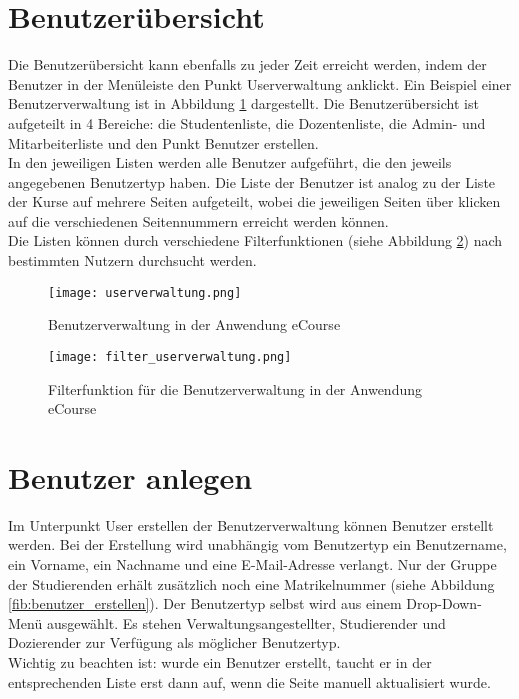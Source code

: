 \section{Benutzerübersicht}
Die Benutzerübersicht kann ebenfalls zu jeder Zeit erreicht werden, indem der Benutzer in der Menüleiste den Punkt \glqq Userverwaltung\grqq{} anklickt. Ein Beispiel einer Benutzerverwaltung ist in Abbildung \ref{fib:userverwaltung} dargestellt.
Die Benutzerübersicht ist aufgeteilt in 4 Bereiche: die Studentenliste, die Dozentenliste, die Admin- und Mitarbeiterliste und den Punkt \glqq Benutzer erstellen\grqq. \\
In den jeweiligen Listen werden alle Benutzer aufgeführt, die den jeweils angegebenen Benutzertyp haben. Die Liste der Benutzer ist analog zu der Liste der Kurse auf mehrere Seiten aufgeteilt, wobei die jeweiligen Seiten über klicken auf die verschiedenen Seitennummern erreicht werden können.\\
Die Listen können durch verschiedene Filterfunktionen (siehe Abbildung \ref{fib:filter}) nach bestimmten Nutzern durchsucht werden. 
\begin{figure}[h]
\centering
\texttt{[image: userverwaltung.png]}
\caption{Benutzerverwaltung in der Anwendung eCourse}
\label{fib:userverwaltung}
\end{figure}

\begin{figure}[h]
\centering
\texttt{[image: filter\_userverwaltung.png]}
\caption{Filterfunktion für die Benutzerverwaltung in der Anwendung eCourse}
\label{fib:filter}
\end{figure}


\section{Benutzer anlegen}
Im Unterpunkt \glqq User erstellen\grqq\: der Benutzerverwaltung können Benutzer erstellt werden. Bei der Erstellung wird unabhängig vom Benutzertyp ein Benutzername, ein Vorname, ein Nachname und eine E-Mail-Adresse verlangt. Nur der Gruppe der Studierenden erhält zusätzlich noch eine Matrikelnummer (siehe Abbildung \ref{fib:benutzer_erstellen}). Der Benutzertyp selbst wird aus einem Drop-Down-Menü ausgewählt. Es stehen Verwaltungsangestellter, Studierender und Dozierender zur Verfügung als möglicher Benutzertyp. \\
Wichtig zu beachten ist: wurde ein Benutzer erstellt, taucht er in der entsprechenden Liste erst dann auf, wenn die Seite manuell aktualisiert wurde.

